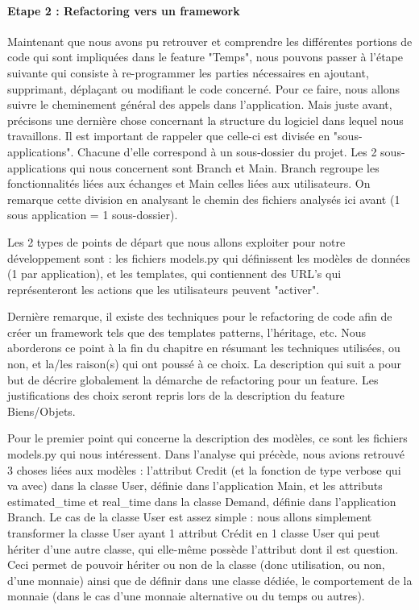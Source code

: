 \paragraph{Etape 2 : Refactoring vers un framework}

Maintenant que nous avons pu retrouver et comprendre les différentes portions de code qui sont impliquées dans le feature "Temps",  nous pouvons passer à l'étape suivante qui consiste à re-programmer les parties nécessaires en ajoutant,  supprimant,  déplaçant ou modifiant le code concerné.  Pour ce faire,  nous allons suivre le cheminement général des appels dans l'application.  Mais juste avant,  précisons une dernière chose concernant la structure du logiciel dans lequel nous travaillons.  Il est important de rappeler que celle-ci est divisée en "sous-applications".  Chacune d'elle correspond à un sous-dossier du projet.  Les 2 sous-applications qui nous concernent sont Branch et Main.  Branch regroupe les fonctionnalités liées aux échanges et Main celles liées aux utilisateurs.  On remarque cette division en analysant le chemin des fichiers analysés ici avant (1 sous application = 1 sous-dossier).  

Les 2 types de points de départ que nous allons exploiter pour notre développement sont : les fichiers models.py qui définissent les modèles de données (1 par application),  et les templates,  qui contiennent des URL's qui représenteront les actions que les utilisateurs peuvent "activer".  

Dernière remarque,   il existe des techniques pour le refactoring de code afin de créer un framework tels que des templates patterns,  l'héritage,  etc.  Nous aborderons ce point à la fin du chapitre en résumant les techniques utilisées,  ou non,  et la/les raison(s) qui ont poussé à ce choix.  La description qui suit a pour but de décrire globalement la démarche de refactoring pour un feature.  Les justifications des choix seront repris lors de la description du feature Biens/Objets.

Pour le premier point qui concerne la description des modèles,  ce sont les fichiers models.py qui nous intéressent.  Dans l'analyse qui précède,  nous avions retrouvé 3 choses liées aux modèles : l'attribut Credit (et la fonction de type verbose qui va avec) dans la classe User,  définie dans l'application Main,  et les attributs estimated\_time et real\_time dans la classe Demand,  définie dans l'application Branch.  Le cas de la classe User est assez simple : nous allons simplement transformer la classe User ayant 1 attribut Crédit en 1 classe User qui peut hériter d'une autre classe,  qui elle-même possède l'attribut dont il est question.  Ceci permet de pouvoir hériter ou non de la classe (donc utilisation,  ou non,  d'une monnaie) ainsi que de définir dans une classe dédiée,  le comportement de la monnaie (dans le cas d'une monnaie alternative ou du temps ou autres).  

